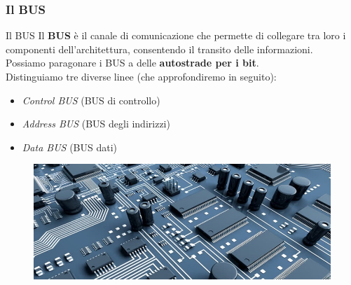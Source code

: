 \subsubsection[Il BUS]{Il BUS}
\begin{frame}
	
	\begin{block}{Il BUS} 
		Il \textbf{BUS} è il canale di comunicazione che permette di collegare tra loro i componenti dell’architettura, consentendo il transito delle informazioni.\\
		Possiamo paragonare i BUS a delle \textbf{autostrade per i bit}.\\
		Distinguiamo tre diverse linee (che approfondiremo in seguito):
		\begin{itemize}
			\item \textit{Control BUS} (BUS di controllo)
			\item \textit{Address BUS} (BUS degli indirizzi)
			\item \textit{Data BUS} (BUS dati)
		\end{itemize}

	\end{block}
	
	\begin{figure}[!htbp] 
		\centering
		\includegraphics[width=0.75\linewidth]{images/3_architetture/bus.jpg}
	\end{figure}
	 
\end{frame}


